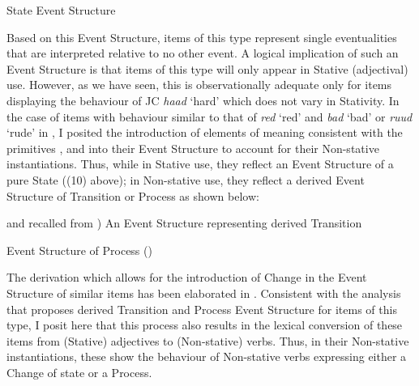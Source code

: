 \ea%
\label{ex:6:10}
State Event Structure \citep[56]{Pustejovsky1991}
\begin{center}
\fbox{\parbox{3cm}{\centering
\begin{forest} [S [e]] \end{forest}}}
\end{center}
\z

Based on this Event Structure, items of this type represent single eventualities that are interpreted relative to no other event. A logical implication of such an Event Structure is that items of this type will only appear in Stative (adjectival) use. However, as we have seen, this is observationally adequate only for items displaying the behaviour of JC \textit{haad} `hard' which does not vary in Stativity. In the case of items with behaviour similar to that of \textit{red} `red' and \textit{bad} `bad' or \textit{ruud} `rude' in , I posited the introduction of elements of meaning consistent with the primitives \CAUSE, \BECOME and \DO into their Event Structure to account for their Non-stative instantiations. Thus, while in Stative use, they reflect an Event Structure of a pure State ((10) above); in Non-stative use, they reflect a derived Event Structure of Transition or Process as shown below:

\ea%
 \label{ex:6:11}
 and  recalled from )
\ea An Event Structure representing derived Transition
\begin{center}
\end{center}
\ex
 Event Structure of Process (\citealt[56]{Pustejovsky1991})\\ 
\begin{center}\fbox{\parbox{5cm}{\centering
\begin{forest}
[P
 [e$_1$,no edge]
 [~~...~~,roof]
 [e$_n$, no edge]
]
\end{forest}
}}\end{center}
\z
\z

The derivation which allows for the introduction of Change in the Event Structure of similar items has been elaborated in . Consistent with the analysis that proposes derived Transition and Process Event Structure for items of this type, I posit here that this process also results in the lexical conversion of these items from (Stative) adjectives to (Non-stative) verbs. Thus, in their Non-stative instantiations, these show the behaviour of Non-stative verbs expressing either a Change of state or a Process. 

